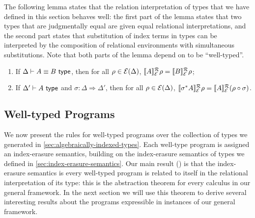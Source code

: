 The following lemma states that the relation interpretation of types
that we have defined in this section behaves well: the first part of
the lemma states that two types that are judgmentally equal are given
equal relational interpretations, and the second part states that
substitution of index terms in types can be interpreted by the
composition of relational environments with simultaneous
substitutions. Note that both parts of the lemma depend on
 to be ``well-typed''.
\begin{lemma}\label{lem:tyeqsubst-relational}
  \begin{enumerate}
  \item If $\Delta \vdash A \equiv B \textsf{ type}$, then for all $\rho \in
    \mathcal{E}(\Delta)$, $\llbracket A \rrbracket^{\mathcal{R}}_{\mathcal{E}}{\rho} =
    \llbracket B \rrbracket^{\mathcal{R}}_{\mathcal{E}}{\rho}$;
  \item If $\Delta' \vdash A \textsf{ type}$ and $\sigma : \Delta \Rightarrow
    \Delta'$, then for all $\rho \in \mathcal{E}(\Delta)$,
    $\llbracket \sigma^*A \rrbracket^{\mathcal{R}}_{\mathcal{E}}{\rho} = \llbracket A \rrbracket^{\mathcal{R}}_{\mathcal{E}}{(}\rho
    \circ \sigma)$.
  \end{enumerate}
\end{lemma}

\subsection{Well-typed Programs}
\label{sec:well-typed-programs}

We now present the rules for well-typed programs over the collection
of types we generated in
\autoref{sec:algebraically-indexed-types}. Each well-type program is
assigned an index-erasure semantics, building on the index-erasure
semantics of types we defined in
\autoref{sec:index-erasure-semantics}. Our main result
() is that the index-erasure semantics is
every well-typed program is related to itself in the relational
interpretation of its type: this is the abstraction theorem for every
calculus in our general framework. In the next section we will use
this theorem to derive several interesting results about the programs
expressible in instances of our general framework.

